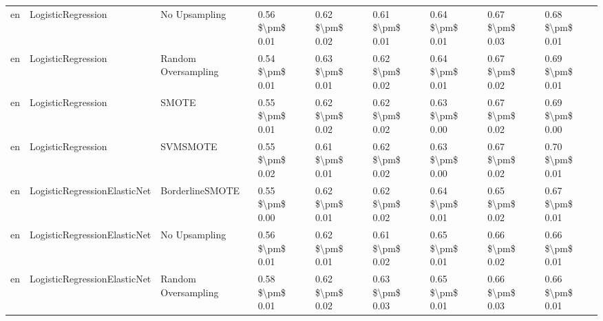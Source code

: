 \begin{tabular}{lllllllll}
      en &              LogisticRegression &                 No Upsampling & 0.56 \$\textbackslash pm\$ 0.01 &           0.62 \$\textbackslash pm\$ 0.02 &       0.61 \$\textbackslash pm\$ 0.01 &        0.64 \$\textbackslash pm\$ 0.01 &                         0.67 \$\textbackslash pm\$ 0.03 &     0.68 \$\textbackslash pm\$ 0.01 \\
      en &              LogisticRegression &           Random Oversampling & 0.54 \$\textbackslash pm\$ 0.01 &           0.63 \$\textbackslash pm\$ 0.01 &       0.62 \$\textbackslash pm\$ 0.02 &        0.64 \$\textbackslash pm\$ 0.01 &                         0.67 \$\textbackslash pm\$ 0.02 &     0.69 \$\textbackslash pm\$ 0.01 \\
      en &              LogisticRegression &                         SMOTE & 0.55 \$\textbackslash pm\$ 0.01 &           0.62 \$\textbackslash pm\$ 0.02 &       0.62 \$\textbackslash pm\$ 0.02 &        0.63 \$\textbackslash pm\$ 0.00 &                         0.67 \$\textbackslash pm\$ 0.02 &     0.69 \$\textbackslash pm\$ 0.00 \\
      en &              LogisticRegression &                      SVMSMOTE & 0.55 \$\textbackslash pm\$ 0.02 &           0.61 \$\textbackslash pm\$ 0.01 &       0.62 \$\textbackslash pm\$ 0.02 &        0.63 \$\textbackslash pm\$ 0.00 &                         0.67 \$\textbackslash pm\$ 0.02 &     0.70 \$\textbackslash pm\$ 0.01 \\
      en &    LogisticRegressionElasticNet &               BorderlineSMOTE & 0.55 \$\textbackslash pm\$ 0.00 &           0.62 \$\textbackslash pm\$ 0.01 &       0.62 \$\textbackslash pm\$ 0.02 &        0.64 \$\textbackslash pm\$ 0.01 &                         0.65 \$\textbackslash pm\$ 0.02 &     0.67 \$\textbackslash pm\$ 0.01 \\
      en &    LogisticRegressionElasticNet &                 No Upsampling & 0.56 \$\textbackslash pm\$ 0.01 &           0.62 \$\textbackslash pm\$ 0.01 &       0.61 \$\textbackslash pm\$ 0.02 &        0.65 \$\textbackslash pm\$ 0.01 &                         0.66 \$\textbackslash pm\$ 0.02 &     0.66 \$\textbackslash pm\$ 0.01 \\
      en &    LogisticRegressionElasticNet &           Random Oversampling & 0.58 \$\textbackslash pm\$ 0.01 &           0.62 \$\textbackslash pm\$ 0.02 &       0.63 \$\textbackslash pm\$ 0.03 &        0.65 \$\textbackslash pm\$ 0.01 &                         0.66 \$\textbackslash pm\$ 0.03 &     0.66 \$\textbackslash pm\$ 0.01 \\

\end{tabular}
